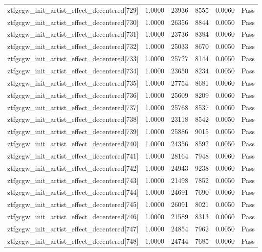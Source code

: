 \begin{table}[htbp]
\begin{tabular}{llrrll}
ztfgcgw\_init\_artist\_effect\_decentered[729] & 1.0000 & 23936 & 8555 & 0.0060 & Pass \\
ztfgcgw\_init\_artist\_effect\_decentered[730] & 1.0000 & 26356 & 8844 & 0.0050 & Pass \\
ztfgcgw\_init\_artist\_effect\_decentered[731] & 1.0000 & 23736 & 8384 & 0.0060 & Pass \\
ztfgcgw\_init\_artist\_effect\_decentered[732] & 1.0000 & 25033 & 8670 & 0.0050 & Pass \\
ztfgcgw\_init\_artist\_effect\_decentered[733] & 1.0000 & 25727 & 8144 & 0.0050 & Pass \\
ztfgcgw\_init\_artist\_effect\_decentered[734] & 1.0000 & 23650 & 8234 & 0.0050 & Pass \\
ztfgcgw\_init\_artist\_effect\_decentered[735] & 1.0000 & 27754 & 8681 & 0.0060 & Pass \\
ztfgcgw\_init\_artist\_effect\_decentered[736] & 1.0000 & 25609 & 8209 & 0.0060 & Pass \\
ztfgcgw\_init\_artist\_effect\_decentered[737] & 1.0000 & 25768 & 8537 & 0.0060 & Pass \\
ztfgcgw\_init\_artist\_effect\_decentered[738] & 1.0000 & 23118 & 8542 & 0.0050 & Pass \\
ztfgcgw\_init\_artist\_effect\_decentered[739] & 1.0000 & 25886 & 9015 & 0.0050 & Pass \\
ztfgcgw\_init\_artist\_effect\_decentered[740] & 1.0000 & 24356 & 8592 & 0.0050 & Pass \\
ztfgcgw\_init\_artist\_effect\_decentered[741] & 1.0000 & 28164 & 7948 & 0.0060 & Pass \\
ztfgcgw\_init\_artist\_effect\_decentered[742] & 1.0000 & 24943 & 9238 & 0.0060 & Pass \\
ztfgcgw\_init\_artist\_effect\_decentered[743] & 1.0000 & 21498 & 7852 & 0.0050 & Pass \\
ztfgcgw\_init\_artist\_effect\_decentered[744] & 1.0000 & 24691 & 7690 & 0.0060 & Pass \\
ztfgcgw\_init\_artist\_effect\_decentered[745] & 1.0000 & 26091 & 8021 & 0.0050 & Pass \\
ztfgcgw\_init\_artist\_effect\_decentered[746] & 1.0000 & 21589 & 8313 & 0.0060 & Pass \\
ztfgcgw\_init\_artist\_effect\_decentered[747] & 1.0000 & 24854 & 7962 & 0.0050 & Pass \\
ztfgcgw\_init\_artist\_effect\_decentered[748] & 1.0000 & 24744 & 7685 & 0.0060 & Pass \\

\end{tabular}
\end{table}

